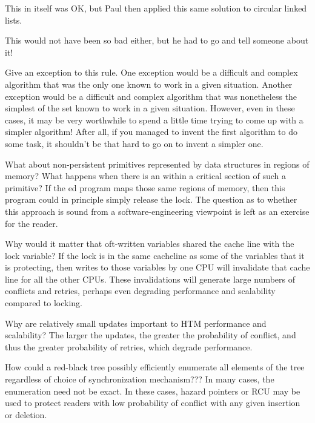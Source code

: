 \begin{enumerate}
	This in itself was OK, but Paul then applied this same solution to
	circular linked lists.

	This would not have been so bad either, but he had to go and tell
	someone about it!

\QuickQ{}
	Give an exception to this rule.
\QuickA{}
	One exception would be a difficult and complex algorithm that
	was the only one known to work in a given situation.
	Another exception would be a difficult and complex algorithm
	that was nonetheless the simplest of the set known to work in
	a given situation.
	However, even in these cases, it may be very worthwhile to spend
	a little time trying to come up with a simpler algorithm!
	After all, if you managed to invent the first algorithm
	to do some task, it shouldn't be that hard to go on to
	invent a simpler one.

\QuickQ{}
	What about non-persistent primitives represented by data
	structures in  regions of memory?
	What happens when there is an  within a critical
	section of such a primitive?
\QuickA{}
	If the ed program maps those same regions of
	memory, then this program could in principle simply release
	the lock.
	The question as to whether this approach is sound from a
	software-engineering viewpoint is left as an exercise for
	the reader.

\QuickQ{}
	Why would it matter that oft-written variables shared the cache
	line with the lock variable?
\QuickA{}
	If the lock is in the same cacheline as some of the variables
	that it is protecting, then writes to those variables by one CPU
	will invalidate that cache line for all the other CPUs.
	These invalidations will
	generate large numbers of conflicts and retries, perhaps even
	degrading performance and scalability compared to locking.

\QuickQ{}
	Why are relatively small updates important to HTM performance
	and scalability?
\QuickA{}
	The larger the updates, the greater the probability of conflict,
	and thus the greater probability of retries, which degrade
	performance.

\QuickQ{}
	How could a red-black tree possibly efficiently enumerate all
	elements of the tree regardless of choice of synchronization
	mechanism???
\QuickA{}
	In many cases, the enumeration need not be exact.
	In these cases, hazard pointers or RCU may be used to protect
	readers with low probability of conflict with any given insertion
	or deletion.


\end{enumerate}
